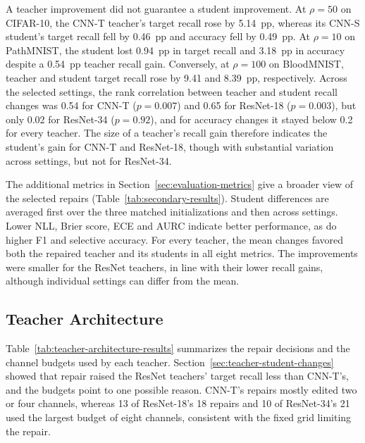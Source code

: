 \documentclass[review,number,sort&compress]{elsarticle}
\theoremstyle{definition}
\begin{document}
A teacher improvement did not guarantee a student improvement. At
$\rho=50$ on CIFAR-10, the CNN-T teacher's target recall rose by
5.14~pp, whereas its CNN-S student's target recall fell by 0.46~pp and
accuracy fell by 0.49~pp. At $\rho=10$ on PathMNIST, the student lost
0.94~pp in target recall and 3.18~pp in accuracy despite a 0.54~pp
teacher recall gain. Conversely, at $\rho=100$ on BloodMNIST, teacher
and student target recall rose by 9.41 and 8.39~pp, respectively.
Across the selected settings, the rank correlation
between teacher and student recall changes was 0.54 for CNN-T
($p=0.007$) and 0.65 for ResNet-18 ($p=0.003$), but only 0.02 for
ResNet-34 ($p=0.92$), and for accuracy changes it stayed below 0.2 for
every teacher. The size of a teacher's recall gain therefore indicates
the student's gain for CNN-T and ResNet-18, though with substantial
variation across settings, but not for ResNet-34.

The additional metrics in Section~\ref{sec:evaluation-metrics} give a
broader view of the selected repairs (Table~\ref{tab:secondary-results}).
Student differences are averaged first over the three matched
initializations and then across settings. Lower NLL, Brier score, ECE
and AURC indicate better performance, as do higher F1 and selective
accuracy. For every teacher, the mean changes favored both the repaired
teacher and its students in all eight metrics. The improvements were
smaller for the ResNet teachers, in line with their lower recall gains,
although individual settings can differ from the mean.

\FloatBarrier
\subsection{Teacher Architecture}
\label{sec:teacher-architecture}

Table~\ref{tab:teacher-architecture-results} summarizes the repair
decisions and the channel budgets used by each teacher.
Section~\ref{sec:teacher-student-changes} showed that repair raised the
ResNet teachers' target recall less than CNN-T's, and the budgets point
to one possible reason. CNN-T's repairs mostly edited two or four
channels, whereas 13 of ResNet-18's 18 repairs and 10 of ResNet-34's 21
used the largest budget of eight channels, consistent with the fixed
grid limiting the repair.
\end{document}
